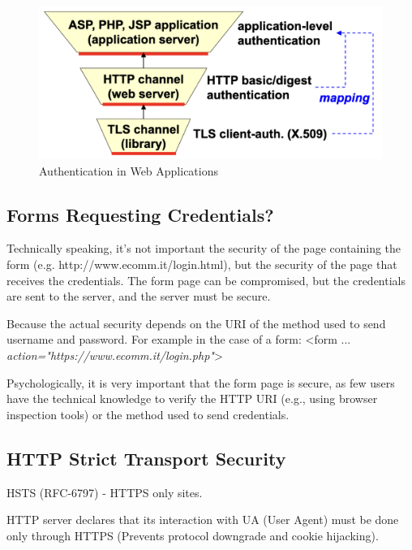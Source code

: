 \begin{figure}[H]
    \centering
    \includegraphics[width=\linewidth]{Images/Appsec/authN_app.png}
    \caption{Authentication in Web Applications}
\end{figure}

\subsection{Forms Requesting Credentials?}
Technically speaking, it's not important the security of the page containing the form (e.g. http://www.ecomm.it/login.html), but the security of the page that receives the credentials. The form page can be compromised, but the credentials are sent to the server, and the server must be secure.

\vspace{0.2cm}

Because the actual security depends on the URI of the method used to send username and password. For example in the case of a form: <form ... \textit{action="https://www.ecomm.it/login.php"}>

\vspace{0.2cm}

Psychologically, it is very important that the form page is secure, as few users have the technical knowledge to verify the HTTP URI (e.g., using browser inspection tools) or the method used to send credentials.

\subsection{HTTP Strict Transport Security}
\begin{center}
    HSTS (RFC-6797) - HTTPS only sites.
\end{center}

HTTP server declares that its interaction with UA (User Agent) must be done only through HTTPS (Prevents protocol downgrade and cookie hijacking).

